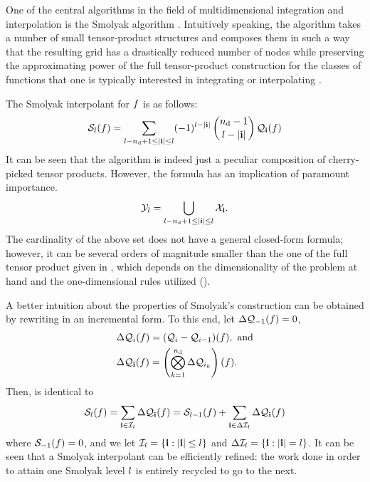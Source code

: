 One of the central algorithms in the field of multidimensional integration and
interpolation is the Smolyak algorithm \cite{smolyak1963}. Intuitively speaking,
the algorithm takes a number of small tensor-product structures and composes
them in such a way that the resulting grid has a drastically reduced number of
nodes while preserving the approximating power of the full tensor-product
construction for the classes of functions that one is typically interested in
integrating or interpolating \cite{klimke2006}.

The Smolyak interpolant for $f$ is as follows:
\begin{equation} \elab{smolyak-original}
  \smolyak{\l}(\f) = \sum_{\l - \nin + 1 \leq |\vi| \leq \l} (-1)^{\l - |\vi|} \, {\nin - 1 \choose \l - |\vi|} \, \tensor{\vi}(\f)
\end{equation}
 It can
be seen that the algorithm is indeed just a peculiar composition of
cherry-picked tensor products. However, the formula has an implication of
paramount importance. 
\begin{equation} \elab{smolyak-grid}
  \Y_l = \bigcup_{\l - \nin + 1 \leq |\vi| \leq \l} \X_\vi.
\end{equation}
The cardinality of the above set does not have a general closed-form formula;
however, it can be several orders of magnitude smaller than the one of the full
tensor product given in , which depends on the
dimensionality of the problem at hand and the one-dimensional rules utilized
().

A better intuition about the properties of Smolyak's construction can be
obtained by rewriting  in an incremental form. To this
end, let $\Delta\mathcal{Q}_{-1}(f) = 0$,
\begin{align}
  & \Delta\tensor{i}(\f) = (\tensor{i} - \tensor{i - 1})(\f), \text{ and} \elab{tensor-delta-1d} \\
  & \Delta\tensor{\vi}(\f) = \left( \bigotimes_{k = 1}^\nin \Delta\tensor{i_k} \right)(\f). \nonumber
\end{align}
Then,  is identical to
\begin{equation} \elab{smolyak-incremental}
  \smolyak{\l}(\f) = \sum_{\vi \in \lindex_\l} \Delta\tensor{\vi}(\f) = \smolyak{\l - 1}(\f) + \sum_{\vi \in \Delta\lindex_\l} \Delta\tensor{\vi}(\f)
\end{equation}
where $\mathcal{S}_{-1}(f) = 0$, and we let $\mathcal{I}_l = \{ \mathbf{i}: |\mathbf{i}| \leq l
\}$ and $\Delta\mathcal{I}_l = \{ \mathbf{i}: |\mathbf{i}| = l \}$. It can be seen that a
Smolyak interpolant can be efficiently refined: the work done in order to attain
one Smolyak level $l$ is entirely recycled to go to the next.

